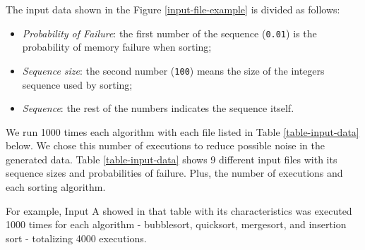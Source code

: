 The input data shown in the Figure \ref{input-file-example} is divided as follows:

\begin{itemize}
    \item \textit{Probability of Failure}: the first number of the sequence (\texttt{0.01}) is the probability of memory failure when sorting;
    \item \textit{Sequence size}: the second number (\texttt{100}) means the size of the integers sequence used by sorting;
    \item \textit{Sequence}: the rest of the numbers indicates the sequence itself.
\end{itemize}

We run 1000 times each algorithm with each file listed in Table \ref{table-input-data} below. We chose this number of executions to reduce possible noise in the generated data. Table \ref{table-input-data} shows 9 different input files with its sequence sizes and probabilities of failure. Plus, the number of executions and each sorting algorithm.

For example, Input A showed in that table with its characteristics was executed 1000 times for each algorithm -  bubblesort, quicksort, mergesort, and insertion sort - totalizing 4000 executions.

